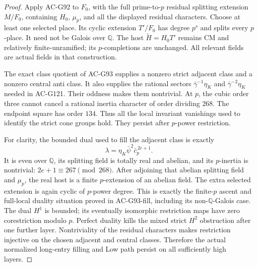 \begin{proof}
Apply AC-G92 to \(F_0\), with the full prime-to-\(p\)
residual splitting extension \(M/F_0\), containing
\(H_0\), \(\mu_p\), and all the displayed residual characters.
Choose at least one selected place.  Its cyclic extension
\(T'/F_0\) has degree \(p^s\) and splits every \(p\)-place.
It need not be Galois over \(\mathbb Q\).
The host \(\widetilde H=H_0T'\) remains CM and relatively
finite-unramified; its \(p\)-completions are unchanged.
All relevant fields are actual fields in that construction.

The exact class quotient of AC-G93 supplies a nonzero strict
adjacent class and a nonzero central anti class.  It also
supplies the rational sectors
\(\bar\gamma^{-1}\eta_K\) and \(\bar\gamma^{-2}\eta_K\)
needed in AC-G121.  Their oddness makes them nontrivial.
At \(p\), the cubic order three cannot cancel a rational
inertia character of order dividing \(268\).  The endpoint
square has order \(134\).  Thus all the local invariant
vanishings used to identify the strict cone groups hold.
They persist after \(p\)-power restriction.

For clarity, the bounded dual used to fill the adjacent
class is exactly
\[
       \lambda=\eta_K\bar\psi^2\bar c_p^{\,2e+1}.
 \tag{AM.14}
\]
It is even over \(\mathbb Q\), its splitting field is
totally real and abelian, and its \(p\)-inertia is nontrivial:
\(2e+1\equiv267\pmod {268}\).
After adjoining that abelian splitting field and \(\mu_p\),
the real host is a finite \(p\)-extension of an abelian
field.  The extra selected extension is again cyclic of
\(p\)-power degree.  This is exactly the finite-\(p\)
ascent and full-local duality situation proved in
AC-G93-fill, including its non-\(\mathbb Q\)-Galois case.
The dual \(H^1\) is bounded; its eventually isomorphic
restriction maps have zero corestriction modulo \(p\).
Perfect duality kills the mixed strict \(H^2\) obstruction
after one further layer.  Nontriviality of the residual
characters makes restriction injective on the chosen
adjacent and central classes.  Therefore the actual
normalized long-entry filling and Low path persist on
all sufficiently high layers.


\end{proof}
